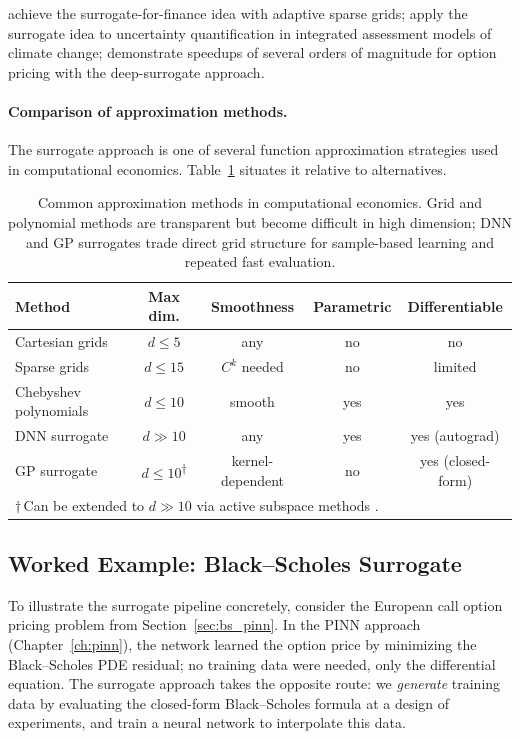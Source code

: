 \documentclass[11pt,a4paper]{report}
\begin{document}
\citet{scheideggertreccani_2018} achieve the surrogate-for-finance idea with adaptive sparse grids; \citet{friedlDeep2023} apply the surrogate idea to uncertainty quantification in integrated assessment models of climate change; \citet{chen2025Deep} demonstrate speedups of several orders of magnitude for option pricing with the deep-surrogate approach.

\paragraph{Comparison of approximation methods.}  The surrogate approach is one of several function approximation strategies used in computational economics.  Table~\ref{tab:approximation_methods_comparison} situates it relative to alternatives.

\begin{table}[ht]
\centering
\small
\begin{tabular}{@{}l c c c c@{}}
\toprule
\textbf{Method} & \textbf{Max dim.} & \textbf{Smoothness} & \textbf{Parametric} & \textbf{Differentiable} \\
\midrule
Cartesian grids & $d \leq 5$ & any & no & no \\
Sparse grids & $d \leq 15$ & $C^k$ needed & no & limited \\
Chebyshev polynomials & $d \leq 10$ & smooth & yes & yes \\
DNN surrogate & $d \gg 10$ & any & yes & yes (autograd) \\
GP surrogate & $d \leq 10$\textsuperscript{$\dagger$} & kernel-dependent & no & yes (closed-form) \\
\bottomrule
\multicolumn{5}{l}{\footnotesize $\dagger$\,Can be extended to $d \gg 10$ via active subspace methods \citep{SCHEIDEGGER201968}.}
\end{tabular}
\caption{Common approximation methods in computational economics.  Grid and polynomial methods are transparent but become difficult in high dimension; DNN and GP surrogates trade direct grid structure for sample-based learning and repeated fast evaluation.}
\label{tab:approximation_methods_comparison}
\end{table}

\subsection{Worked Example: Black--Scholes Surrogate}

To illustrate the surrogate pipeline concretely, consider the European call option pricing problem from Section~\ref{sec:bs_pinn}.  In the PINN approach (Chapter~\ref{ch:pinn}), the network learned the option price by minimizing the Black--Scholes PDE residual; no training data were needed, only the differential equation.  The surrogate approach takes the opposite route: we \emph{generate} training data by evaluating the closed-form Black--Scholes formula at a design of experiments, and train a neural network to interpolate this data.
\end{document}
